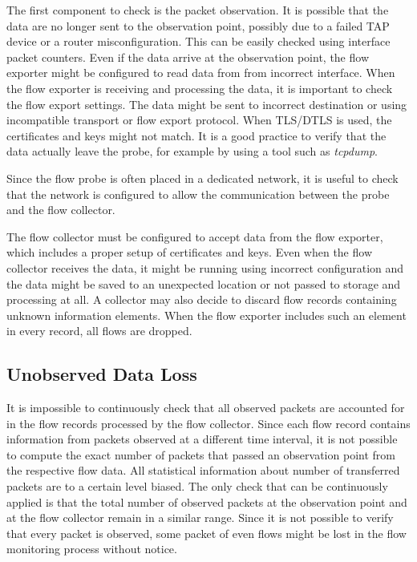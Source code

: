 The first component to check is the packet observation. It is possible that the data are no longer sent to the observation point, possibly due to a failed TAP device or a router misconfiguration. This can be easily checked using interface packet counters. Even if the data arrive at the observation point, the flow exporter might be configured to read data from from incorrect interface. When the flow exporter is receiving and processing the data, it is important to check the flow export settings. The data might be sent to incorrect destination or using incompatible transport or flow export protocol. When TLS/DTLS is used, the certificates and keys might not match. It is a good practice to verify that the data actually leave the probe, for example by using a tool such as \emph{tcpdump}.

Since the flow probe is often placed in a dedicated network, it is useful to check that the network is configured to allow the communication between the probe and the flow collector.

The flow collector must be configured to accept data from the flow exporter, which includes a proper setup of certificates and keys. Even when the flow collector receives the data, it might be running using incorrect configuration and the data might be saved to an unexpected location or not passed to storage and processing at all. A collector may also decide to discard flow records containing unknown information elements. When the flow exporter includes such an element in every record, all flows are dropped. 

\subsection{Unobserved Data Loss}

It is impossible to continuously check that all observed packets are accounted for in the flow records processed by the flow collector. Since each flow record contains information from packets observed at a different time interval, it is not possible to compute the exact number of packets that passed an observation point from the respective flow data. All statistical information about number of transferred packets are to a certain level biased. The only check that can be continuously applied is that the total number of observed packets at the observation point and at the flow collector remain in a similar range. Since it is not possible to verify that every packet is observed, some packet of even flows might be lost in the flow monitoring process without notice.


